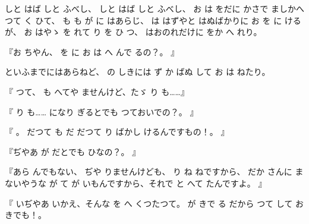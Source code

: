 
しと
はば
しと
ふべし、
しと
はば
しと
ふべし、
お
は
をだに
かさで
ましかへつて
く
ひて、
も
も
が
に
はあらじ、
は
はずやと
はぬばかりに
お
を
に
けるが、
お
はやゝ
を
れて
り
を
ひ
つ、
はおのれだけに
をか
へ
れり。

『お
ちやん、
を
に
お
は
へ
んで
るの？。
』

といふまでにはあらねど、
の
しきには
ず
か
ばぬ
して
お
は
ねたり。

『
つて、
も
へてや
ませんけど、たゞ
り
も……』

『
り
も……
になり
ぎるとでも
つておいでの？。
』

『
。
だつて
も
だ
だつて
り
ばかし
けるんですもの！。
』

『ぢやあ
が
だとでも
ひなの？。
』

『あら
んでもない、
ぢや
りませんけども、
り
ね
ねですから、
だか
さんに
まないやうな
が
て
が
いもんですから、それで
と
へて
たんですよ。
』

『
いぢやあ
いかえ、そんな
を
へ
くつたつて。
が
きで
る
だから
つて
して
お
きでも！。


